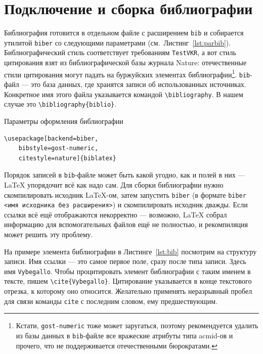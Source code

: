 \documentclass[14pt, russian]{scrartcl}
\begin{document}
\section{Подключение и сборка библиографии}

Библиография готовится в отдельном файле с расширением \texttt{bib} и собирается утилитой \texttt{biber} со следующими параметрами (см.~Листинг~\ref{lst:parbib}). Библиографический стиль соответствует требованиям \texttt{TestVKR}, а вот стиль цитирования взят из библиографической базы журнала Nature: отечественные стили цитирования могут падать на буржуйских элементах библиографии\footnote{Кстати, \texttt{gost-numeric} тоже может заругаться, поэтому рекомендуется удалить из базы данных в \texttt{bib}-файле все вражеские атрибуты типа acmid-ов и прочего, что не поддерживается отечественными бюрократами.}. \texttt{bib}-файл --- это база данных, где хранятся записи об использованных источниках. Конкретное имя этого файла указывается командой \texttt{\textbackslash bibliography}. В нашем случае это \texttt{\textbackslash bibliography\{biblio\}}.

\vspace{3pt}
\begin{listing}[!htb]
\caption{Параметры оформления библиографии}
\begin{verbatim}
\usepackage[backend=biber, 
    bibstyle=gost-numeric,
    citestyle=nature]{biblatex}
\end{verbatim}
\label{lst:parbib}
\end{listing}

Порядок записей в \texttt{bib}-файле может быть какой угодно, как и полей в них --- \LaTeX{} упорядочит всё как надо сам. Для сборки библиографии нужно скомпилировать исходник \LaTeX{}-ом, затем запустить \texttt{biber} (в формате \texttt{biber <имя исходника без расширения>}) и скомпилировать исходник дважды. Если ссылки всё ещё отображаются некорректно --- возможно, \LaTeX{} собрал информацию для вспомогательных файлов ещё не полностью, и рекомпиляция может решить эту проблему.

На примере элемента библиографии в Листинге~\ref{lst:bib} посмотрим на структуру записи. Имя ссылки --- это самое первое поле, сразу после типа записи. Здесь имя \texttt{Vybegallo}. Чтобы процитировать элемент библиографии с таким именем в тексте, пишем \texttt{\textbackslash cite\{Vybegallo\}}. Цитирование указывается в конце текстового отрезка, к которому оно относится. Желательно применять неразрывный пробел для связи команды \texttt{cite} с последним словом, ему предшествующим.
\end{document}
